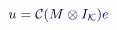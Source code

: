 \documentclass[12pt]{article}
\begin{document}
\makeatletter
\renewcommand*{\@textcolor}[3]{%
  \protect\leavevmode
  \begingroup
    \color#1{#2}#3%
  \endgroup
}
\makeatother
\begin{displaymath}
\mathcolor[RGB]{0,0,15}{u} \mathcolor[RGB]{0,0,30}{=} \mathcal { \mathcolor[RGB]{0,0,45}{C} } \mathcolor[RGB]{0,0,60}{(} \mathcolor[RGB]{0,0,75}{M} \mathcolor[RGB]{0,0,90}{\otimes} \mathcolor[RGB]{0,0,105}{I} _ { \mathcal { \mathcolor[RGB]{0,0,120}{K} } } \mathcolor[RGB]{0,0,135}{)} \mathcolor[RGB]{0,0,150}{e}
\end{displaymath}
\end{document}
